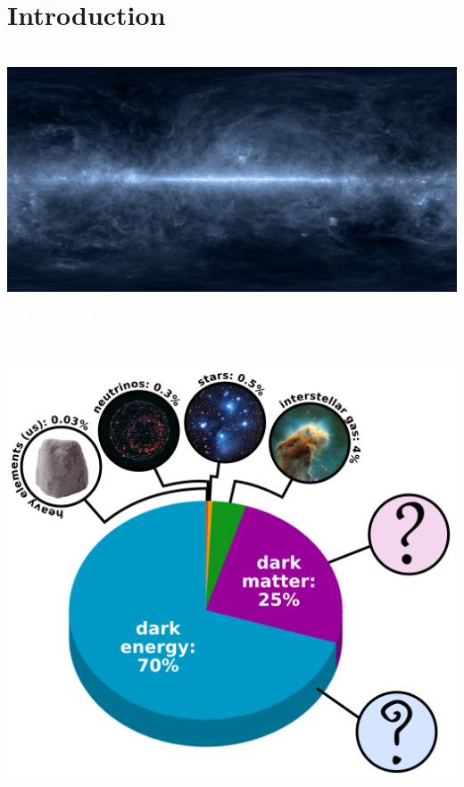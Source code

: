 \documentclass[compress]{beamer}
\begin{document}
\section*{Introduction}

\begin{frame}
\vspace{-2.3 cm}
\mbox{\hspace{-7 cm} \includegraphics[width=1.85\linewidth]{pictures/spacedust.jpg}}

\vspace{-6.3 cm}
\begin{center}
\begin{minipage}{0.8\linewidth}
\textcolor{white}{\Huge Matter as we know it is}

\vspace{0.4 cm}
\textcolor{white}{\Huge a minority of the universe.}
\end{minipage}
\end{center}
\end{frame}

\begin{frame}
\begin{center}
\includegraphics[width=0.95\linewidth]{pictures/piechart.png}
\end{center}
\end{frame}
\end{document}
